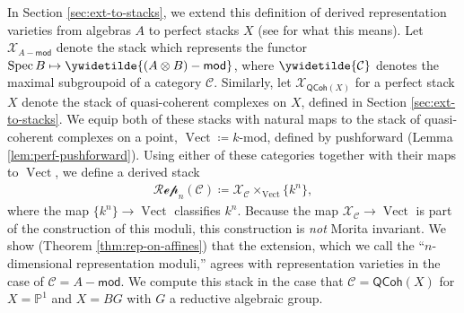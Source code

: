 \documentclass{article}
\numberwithin{equation}{section}
\theoremstyle{quest}
\theoremstyle{definition}
\theoremstyle{remark}
\newcommand{\msf}{\mathsf}
\newcommand{\Mod}{-\msf{mod}}
\DeclareMathOperator{\Spec}{Spec}
\DeclareMathOperator{\Vect}{Vect}
\begin{document}
	
In Section \ref{sec:ext-to-stacks}, we extend this definition of derived representation varieties from algebras $A$ to perfect stacks $X$ (see \cite{BFN} for what this means). Let $\mathcal{X}_{A\Mod}$ denote the stack which represents the functor $\Spec B\mapsto \ywidetilde{(A\otimes B)\Mod}$, where $\ywidetilde{\mathcal{C}}$ denotes the maximal subgroupoid of a category $\mathcal{C}$. Similarly, let $\mathcal{X}_{\mathsf{QCoh}(X)}$ for a perfect stack $X$ denote the stack of quasi-coherent complexes on $X$, defined in Section \ref{sec:ext-to-stacks}. We equip both of these stacks with natural maps to the stack of quasi-coherent complexes on a point, $\Vect\coloneqq k\text{-mod}$, defined by pushforward (Lemma \ref{lem:perf-pushforward}). Using either of these categories together with their maps to $\Vect$, we define a derived stack
\begin{align*}
	\mathscr{Rep}_n(\mathcal{C})\coloneqq \mathcal{X}_{\mathcal{C}}\times _{\Vect}\{k^n\} ,
\end{align*} 
where the map $\{k^n\} \to \Vect$ classifies $k^n$. Because the map $ \mathcal{X}_{\mathcal{C}}\to \Vect$ is part of the construction of this moduli, this construction is \textit{not} Morita invariant. We show (Theorem \ref{thm:rep-on-affines}) that the extension, which we call the ``$n$-dimensional representation moduli,'' agrees with representation varieties in the case of $\mathcal{C}=A\Mod$. We compute this stack in the case that $\mathcal{C}=\mathsf{QCoh}(X)$ for $X=\mathbb{P} ^1$ and $X=BG$ with $G$ a reductive algebraic group.
\end{document}

